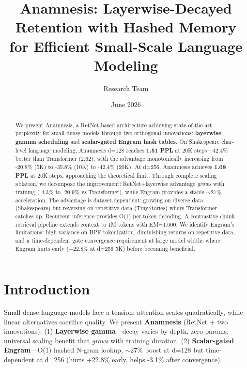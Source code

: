 \documentclass[twocolumn]{article}
\title{Anamnesis: Layerwise-Decayed Retention with Hashed Memory\\for Efficient Small-Scale Language Modeling}
\author{Research Team}
\date{June 2026}
\begin{document}
\maketitle

\begin{abstract}
We present Anamnesis, a RetNet-based architecture achieving state-of-the-art perplexity for small dense models through two orthogonal innovations: \textbf{layerwise gamma scheduling} and \textbf{scalar-gated Engram hash tables}. On Shakespeare char-level language modeling, Anamnesis d=128 reaches \textbf{1.51 PPL} at 20K steps---42.4\% better than Transformer (2.62), with the advantage monotonically increasing from -20.8\% (5K) to -35.8\% (10K) to -42.4\% (20K). At d=256, Anamnesis achieves \textbf{1.08 PPL} at 20K steps, approaching the theoretical limit. Through complete scaling ablation, we decompose the improvement: RetNet+layerwise advantage \emph{grows} with training (-4.3\% to -20.9\% vs Transformer), while Engram provides a stable $\sim$27\% acceleration. The advantage is dataset-dependent: growing on diverse data (Shakespeare) but reversing on repetitive data (TinyStories) where Transformer catches up. Recurrent inference provides O(1) per-token decoding. A contrastive chunk retrieval pipeline extends context to 1M tokens with EM=1.000. We identify Engram's limitations: high variance on BPE tokenization, diminishing returns on repetitive data, and a time-dependent gate convergence requirement at large model widths where Engram hurts early (+22.8\% at d=256 5K) before becoming beneficial.
\end{abstract}

\section{Introduction}

Small dense language models face a tension: attention scales quadratically, while linear alternatives sacrifice quality. We present \textbf{Anamnesis} (RetNet + two innovations): (1) \textbf{Layerwise gamma}---decay varies by depth, zero params, universal scaling benefit that \emph{grows} with training duration. (2) \textbf{Scalar-gated Engram}---O(1) hashed N-gram lookup, $\sim$27\% boost at d=128 but time-dependent at d=256 (hurts +22.8\% early, helps -3.1\% after convergence).
\end{document}
